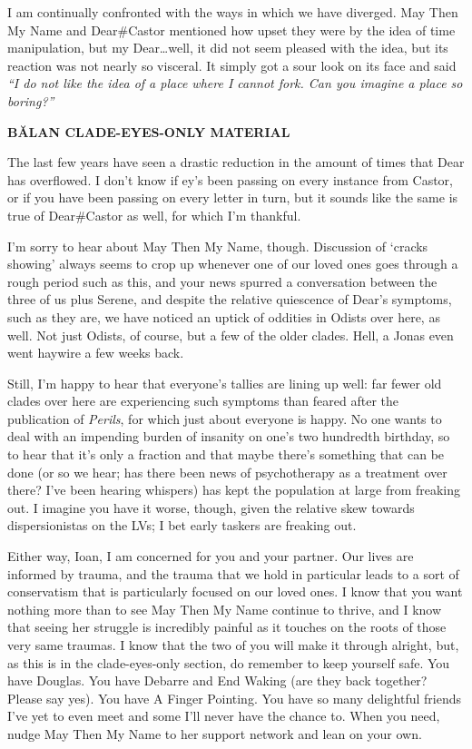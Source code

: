 I am continually confronted with the ways in which we have diverged. May Then My Name and Dear\#Castor mentioned how upset they were by the idea of time manipulation, but my Dear\ldots well, it did not seem pleased with the idea, but its reaction was not nearly so visceral. It simply got a sour look on its face and said \emph{``I do not like the idea of a place where I cannot fork. Can you imagine a place so boring?''}

\begin{center}
\textbf{BĂLAN CLADE-EYES-ONLY MATERIAL}
\end{center}

\noindent The last few years have seen a drastic reduction in the amount of times that Dear has overflowed. I don't know if ey's been passing on every instance from Castor, or if you have been passing on every letter in turn, but it sounds like the same is true of Dear\#Castor as well, for which I'm thankful.

I'm sorry to hear about May Then My Name, though. Discussion of `cracks showing' always seems to crop up whenever one of our loved ones goes through a rough period such as this, and your news spurred a conversation between the three of us plus Serene, and despite the relative quiescence of Dear's symptoms, such as they are, we have noticed an uptick of oddities in Odists over here, as well. Not just Odists, of course, but a few of the older clades. Hell, a Jonas even went haywire a few weeks back.

Still, I'm happy to hear that everyone's tallies are lining up well: far fewer old clades over here are experiencing such symptoms than feared after the publication of \emph{Perils}, for which just about everyone is happy. No one wants to deal with an impending burden of insanity on one's two hundredth birthday, so to hear that it's only a fraction and that maybe there's something that can be done (or so we hear; has there been news of psychotherapy as a treatment over there? I've been hearing whispers) has kept the population at large from freaking out. I imagine you have it worse, though, given the relative skew towards dispersionistas on the LVs; I bet early taskers are freaking out.

Either way, Ioan, I am concerned for you and your partner. Our lives are informed by trauma, and the trauma that we hold in particular leads to a sort of conservatism that is particularly focused on our loved ones. I know that you want nothing more than to see May Then My Name continue to thrive, and I know that seeing her struggle is incredibly painful as it touches on the roots of those very same traumas. I know that the two of you will make it through alright, but, as this is in the clade-eyes-only section, do remember to keep yourself safe. You have Douglas. You have Debarre and End Waking (are they back together? Please say yes). You have A Finger Pointing. You have so many delightful friends I've yet to even meet and some I'll never have the chance to. When you need, nudge May Then My Name to her support network and lean on your own.

